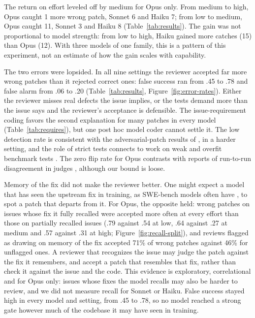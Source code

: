 \documentclass[sigconf,nonacm]{acmart}
\begin{document}
The return on effort leveled off by medium for Opus only. From medium to high, Opus caught 1 more wrong patch, Sonnet 6 and Haiku 7; from low to medium, Opus caught 11, Sonnet 3 and Haiku 8 (Table~\ref{tab:results}). The gain was not proportional to model strength: from low to high, Haiku gained more catches (15) than Opus (12). With three models of one family, this is a pattern of this experiment, not an estimate of how the gain scales with capability.

The two errors were lopsided. In all nine settings the reviewer accepted far more wrong patches than it rejected correct ones: false success ran from .45 to .78 and false alarm from .06 to .20 (Table~\ref{tab:results}, Figure~\ref{fig:error-rates}). Either the reviewer misses real defects the issue implies, or the tests demand more than the issue says and the reviewer's acceptance is defensible. The issue-requirement coding favors the second explanation for many patches in every model (Table~\ref{tab:requires}), but one post hoc model coder cannot settle it. The low detection rate is consistent with the adversarial-patch results of \citet{trad2026adversarial}, in a harder setting, and the role of strict tests connects to work on weak and overfit benchmark tests \cite{ahmed2026overfitting,wang2026solved,yu2026sweabs}. The zero flip rate for Opus contrasts with reports of run-to-run disagreement in judges \cite{zhao2026bias}, although our bound is loose.

Memory of the fix did not make the reviewer better. One might expect a model that has seen the upstream fix in training, as SWE-bench models often have \cite{liang2025illusion}, to spot a patch that departs from it. For Opus, the opposite held: wrong patches on issues whose fix it fully recalled were accepted more often at every effort than those on partially recalled issues (.79 against .54 at low, .64 against .27 at medium and .57 against .31 at high; Figure~\ref{fig:recall-split}), and reviews flagged as drawing on memory of the fix accepted 71\% of wrong patches against 46\% for unflagged ones. A reviewer that recognizes the issue may judge the patch against the fix it remembers, and accept a patch that resembles that fix, rather than check it against the issue and the code. This evidence is exploratory, correlational and for Opus only: issues whose fixes the model recalls may also be harder to review, and we did not measure recall for Sonnet or Haiku. False success stayed high in every model and setting, from .45 to .78, so no model reached a strong gate however much of the codebase it may have seen in training.
\end{document}
